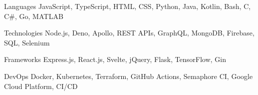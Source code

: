 

\begin{cvskills}

  \cvskill
    {Languages} %
    {JavaScript, TypeScript, HTML, CSS, Python, Java, Kotlin, Bash, C, C\#, Go, MATLAB } %

  \cvskill
    {Technologies} %
    {Node.js, Deno, Apollo, REST APIs, GraphQL, MongoDB, Firebase, SQL, Selenium} %

  \cvskill
    {Frameworks} %
    {Express.js, React.js, Svelte, jQuery, Flask, TensorFlow, Gin} %

  \cvskill
    {DevOps} %
    {Docker, Kubernetes, Terraform, GitHub Actions, Semaphore CI, Google Cloud Platform, CI/CD} %
    
\end{cvskills}
